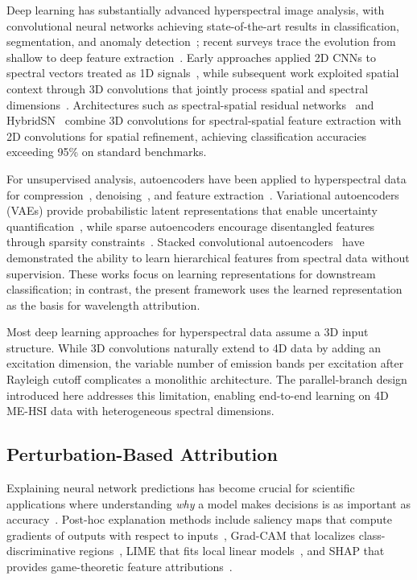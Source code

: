 Deep learning has substantially advanced hyperspectral image analysis, with convolutional neural networks achieving state-of-the-art results in classification, segmentation, and anomaly detection~\cite{li2019deep,paoletti2019deep}; recent surveys trace the evolution from shallow to deep feature extraction~\cite{rasti2020featureextraction,ahmad2022survey}.
Early approaches applied 2D CNNs to spectral vectors treated as 1D signals~\cite{hu2015deep}, while subsequent work exploited spatial context through 3D convolutions that jointly process spatial and spectral dimensions~\cite{chen2016deep}.
Architectures such as spectral-spatial residual networks~\cite{zhong2017spectral} and HybridSN~\cite{roy2020hybridsn} combine 3D convolutions for spectral-spatial feature extraction with 2D convolutions for spatial refinement, achieving classification accuracies exceeding 95\% on standard benchmarks.

For unsupervised analysis, autoencoders have been applied to hyperspectral data for compression~\cite{chen2014deep}, denoising~\cite{vincent2008extracting}, and feature extraction~\cite{mou2017unsupervised}.
Variational autoencoders (VAEs) provide probabilistic latent representations that enable uncertainty quantification~\cite{kingma2013auto}, while sparse autoencoders encourage disentangled features through sparsity constraints~\cite{ng2011sparse}.
Stacked convolutional autoencoders~\cite{masci2011stacked} have demonstrated the ability to learn hierarchical features from spectral data without supervision.
These works focus on learning representations for downstream classification; in contrast, the present framework uses the learned representation as the basis for wavelength attribution.

Most deep learning approaches for hyperspectral data assume a 3D input structure.
While 3D convolutions naturally extend to 4D data by adding an excitation dimension, the variable number of emission bands per excitation after Rayleigh cutoff complicates a monolithic architecture.
The parallel-branch design introduced here addresses this limitation, enabling end-to-end learning on 4D ME-HSI data with heterogeneous spectral dimensions.

\subsection{Perturbation-Based Attribution}
\label{sec:related_explain}

Explaining neural network predictions has become crucial for scientific applications where understanding \emph{why} a model makes decisions is as important as accuracy~\cite{gilpin2018explaining}.
Post-hoc explanation methods include saliency maps that compute gradients of outputs with respect to inputs~\cite{simonyan2014deep}, Grad-CAM that localizes class-discriminative regions~\cite{selvaraju2017grad}, LIME that fits local linear models~\cite{ribeiro2016should}, and SHAP that provides game-theoretic feature attributions~\cite{lundberg2017unified}.

